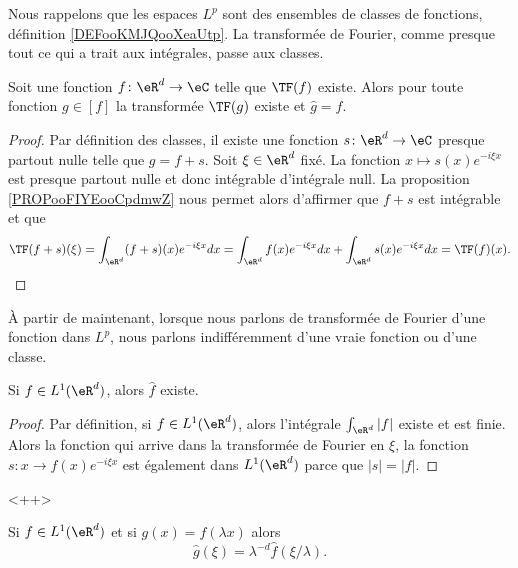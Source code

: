 Nous rappelons que les espaces \( L^p\) sont des ensembles de classes de fonctions, définition \ref{DEFooKMJQooXeaUtp}. La transformée de Fourier, comme presque tout ce qui a trait aux intégrales, passe aux classes.

\begin{lemma}
    Soit une fonction \( f\colon \eR^d\to \eC\) telle que \( \TF(f)\) existe. Alors pour toute fonction \( g\in[f]\) la transformée \( \TF(g)\) existe et \( \hat g=\hat f\).
\end{lemma}

\begin{proof}
    Par définition des classes, il existe une fonction \( s\colon \eR^d\to \eC\) presque partout nulle telle que \( g=f+s\). Soit \( \xi\in \eR^d\) fixé. La fonction \( x\mapsto s(x) e^{-i\xi x}\) est presque partout nulle et donc intégrable d'intégrale null. La proposition \ref{PROPooFIYEooCpdmwZ} nous permet alors d'affirmer que \( f+s\) est intégrable et que
    \begin{equation}
        \TF(f+s)(\xi)=\int_{\eR^d}(f+s)(x) e^{-i\xi x}dx=\int_{\eR^d}f(x) e^{-i\xi x}dx+\int_{\eR^d}s(x) e^{-i\xi x}dx=\TF(f)(x).
    \end{equation}
\end{proof}

À partir de maintenant, lorsque nous parlons de transformée de Fourier d'une fonction dans \( L^p\), nous parlons indifféremment d'une vraie fonction ou d'une classe.

\begin{lemma}
    Si \( f\in L^1(\eR^d)\), alors \( \hat f\) existe.
\end{lemma}

\begin{proof}
    Par définition, si \( f\in L^1(\eR^d)\), alors l'intégrale \( \int_{\eR^d}| f |\) existe et est finie. Alors la fonction qui arrive dans la transformée de Fourier en \( \xi\), la fonction \( s\colon x\to f(x) e^{-i\xi x}\) est également dans \( L^1(\eR^d)\) parce que \( | s |=| f |\).
\end{proof}
<++>

\begin{lemma}       \label{LEMooKGDKooVXSMCn}
    Si \( f\in L^1(\eR^d)\) et si \( g(x)=f(\lambda x)\) alors
    \begin{equation}
        \hat g(\xi)=\lambda^{-d}\hat f(\xi/\lambda).
    \end{equation}
\end{lemma}

